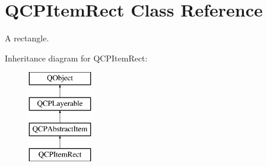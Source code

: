 \hypertarget{class_q_c_p_item_rect}{}\section{Q\+C\+P\+Item\+Rect Class Reference}
\label{class_q_c_p_item_rect}


A rectangle.  


Inheritance diagram for Q\+C\+P\+Item\+Rect\+:\begin{figure}[H]
\begin{center}
\leavevmode
\includegraphics[height=4.000000cm]{class_q_c_p_item_rect}
\end{center}
\end{figure}
